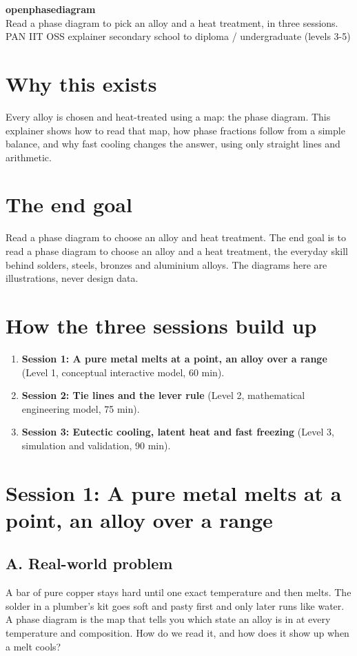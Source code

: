 \documentclass[11pt,a4paper]{article}
\begin{document}
\begin{center}{\LARGE\bfseries openphasediagram}\\[0.4em]{\large Read a phase diagram to pick an alloy and a heat treatment, in three sessions.}\\[0.2em]\small PAN IIT OSS explainer \textbullet{} secondary school to diploma / undergraduate (levels 3-5)\end{center}

\section*{Why this exists}
Every alloy is chosen and heat-treated using a map: the phase diagram. This explainer shows how to read that map, how phase fractions follow from a simple balance, and why fast cooling changes the answer, using only straight lines and arithmetic.

\section*{The end goal}
Read a phase diagram to choose an alloy and heat treatment. The end goal is to read a phase diagram to choose an alloy and a heat treatment, the everyday skill behind solders, steels, bronzes and aluminium alloys. The diagrams here are illustrations, never design data.

\section*{How the three sessions build up}
\begin{enumerate}[nosep]
\item \textbf{Session 1: A pure metal melts at a point, an alloy over a range} (Level 1, conceptual interactive model, 60 min).
\item \textbf{Session 2: Tie lines and the lever rule} (Level 2, mathematical engineering model, 75 min).
\item \textbf{Session 3: Eutectic cooling, latent heat and fast freezing} (Level 3, simulation and validation, 90 min).
\end{enumerate}

\section{Session 1: A pure metal melts at a point, an alloy over a range}

\subsection*{A. Real-world problem}
A bar of pure copper stays hard until one exact temperature and then melts. The solder in a plumber's kit goes soft and pasty first and only later runs like water. A phase diagram is the map that tells you which state an alloy is in at every temperature and composition. How do we read it, and how does it show up when a melt cools?
\end{document}
